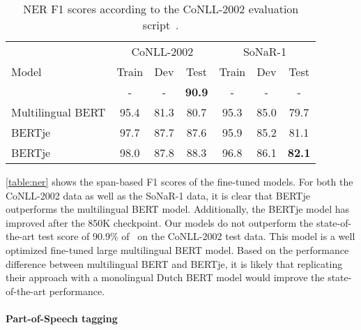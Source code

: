 \documentclass[11pt]{article}
\begin{document}
\begin{table}[t]
\begin{center}
  \begin{tabular}{l || c c c | c c c}
    \toprule
                   & \multicolumn{3}{c|}{CoNLL-2002} & \multicolumn{3}{c}{SoNaR-1}                                                   \\
    Model          & Train                           & Dev                       & Test           & Train & Dev   & Test           \\
    \midrule
    \citet{wu2019surprising} & - & - & \textbf{90.9}    & - & - & - \\
    \midrule
    Multilingual BERT          & 95.4                           & 81.3                     & 80.7          & 95.3 & 85.0 & 79.7          \\
BERTje & 97.7                           & 87.7                     & 87.6          & 95.9 & 85.2 & 81.1          \\
    BERTje         & 98.0                           & 87.8                     & 88.3 & 96.8 & 86.1 & \textbf{82.1} \\
    \bottomrule
  \end{tabular}
\end{center}
   \caption{\label{table:ner}NER F1 scores according to the CoNLL-2002 evaluation script~\citep{tjong2002conll}.}
\end{table}


\autoref{table:ner} shows the span-based F1 scores of the fine-tuned models.
For both the CoNLL-2002 data as well as the SoNaR-1 data, it is clear that BERTje outperforms the multilingual BERT model.
Additionally, the BERTje model has improved after the 850K checkpoint.
Our models do not outperform the state-of-the-art test score of 90.9\% of~\citet{wu2019surprising} on the CoNLL-2002 test data.
This model is a well optimized fine-tuned large multilingual BERT model.
Based on the performance difference between multilingual BERT and BERTje, it is likely that replicating their approach with a monolingual Dutch BERT model would improve the state-of-the-art performance.


\paragraph{Part-of-Speech tagging}
\end{document}
